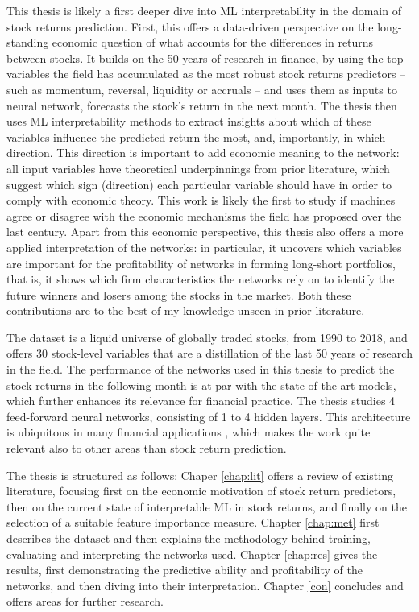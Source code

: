 This thesis is likely a first deeper dive into ML interpretability in the domain of stock returns prediction. First, this offers a data-driven perspective on the long-standing economic question of what accounts for the differences in returns between stocks. It builds on the 50 years of research in finance, by using the top variables the field has accumulated as the most robust stock returns predictors -- such as momentum, reversal, liquidity or accruals -- and uses them as inputs to neural network, forecasts the stock's return in the next month. The thesis then uses ML interpretability methods to extract insights about which of these variables influence the predicted return the most, and, importantly, in which direction. This direction is important to add economic meaning to the network: all input variables have theoretical underpinnings from prior literature, which suggest which sign (direction) each particular variable should have in order to comply with economic theory. This work is likely the first to study if machines agree or disagree with the economic mechanisms the field has proposed over the last century. Apart from this economic perspective, this thesis also offers a more applied interpretation of the networks: in particular, it uncovers which variables are important for the profitability of networks in forming long-short portfolios, that is, it shows which firm characteristics the networks rely on to identify the future winners and losers among the stocks in the market. Both these contributions are to the best of my knowledge unseen in prior literature.  

The dataset is a liquid universe of globally traded stocks, from 1990 to 2018, and offers 30 stock-level variables that are a distillation of the last 50 years of research in the field. The performance of the networks used in this thesis to predict the stock returns in the following month is at par with the state-of-the-art models, which further enhances its relevance for financial practice. The thesis studies 4 feed-forward neural networks, consisting of 1 to 4 hidden layers. This architecture is ubiquitous in many financial applications \citep{fadlalla2001analysis}, which makes the work quite relevant also to other areas than stock return prediction.    

The thesis is structured as follows: Chaper \ref{chap:lit} offers a review of existing literature, focusing first on the economic motivation of stock return predictors, then on the current state of interpretable ML in stock returns, and finally on the selection of a suitable feature importance measure. Chapter \ref{chap:met} first describes the dataset and then explains the methodology behind training, evaluating and interpreting the networks used. Chapter \ref{chap:res} gives the results, first demonstrating the predictive ability and profitability of the networks, and then diving into their interpretation. Chapter \ref{con} concludes and offers areas for further research. 
